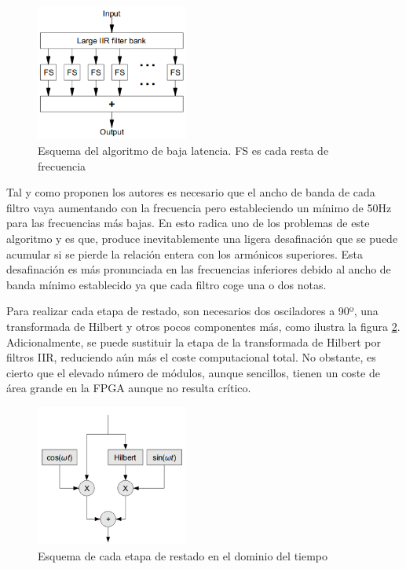 \begin{figure}
\begin{center}
\includegraphics[width=5cm]{img/filtros_hilbert.png}
\caption{\label{fig:fshil}Esquema del algoritmo de baja latencia. FS es cada resta de frecuencia}
\end{center}
\end{figure}

Tal y como proponen los autores es necesario que el ancho de banda de cada filtro vaya aumentando con la frecuencia pero estableciendo un mínimo de 50Hz para las frecuencias más bajas. En esto radica uno de los problemas de este algoritmo y es que, produce inevitablemente una ligera desafinación que se puede acumular si se pierde la relación entera con los armónicos superiores. Esta desafinación es más pronunciada en las frecuencias inferiores debido al ancho de banda mínimo establecido ya que cada filtro coge una o dos notas.

Para realizar cada etapa de restado, son necesarios dos osciladores a 90º, una transformada de Hilbert y otros pocos componentes más, como ilustra la figura \ref{fig:restahil}. Adicionalmente, se puede sustituir la etapa de la transformada de Hilbert por filtros IIR, reduciendo aún más el coste computacional total. No obstante, es cierto que el elevado número de módulos, aunque sencillos, tienen un coste de área grande en la FPGA aunque no resulta crítico.

\begin{figure}[!tb]
\begin{center}
\includegraphics[width=5cm]{img/fs_hilbert.png}
\caption{\label{fig:restahil}Esquema de cada etapa de restado en el dominio del tiempo}
\end{center}
\end{figure}

